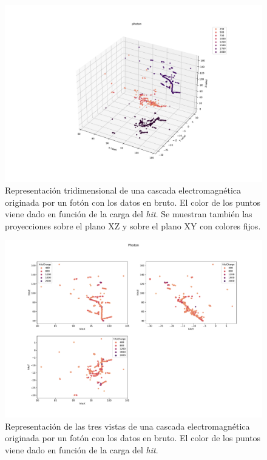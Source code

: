 \documentclass[a4paper,12pt,twoside,titlepage]{article}
\begin{document}
\begin{figure}[h!]
  \centering
  \includegraphics[scale=0.39]{3d_3.pdf}
  \caption{Representación tridimensional de una cascada electromagnética originada por un fotón con los datos en bruto. El color de los puntos viene dado en función de la carga del \textit{hit}. Se muestran también las proyecciones sobre el plano XZ y sobre el plano XY con colores fijos.}
  \label{fig:3d}
\end{figure}
\begin{figure}[h!]
  \centering
  \includegraphics[scale=0.39]{vistas_3.pdf}
  \caption{Representación de las tres vistas de una cascada electromagnética originada por un fotón con los datos en bruto. El color de los puntos viene dado en función de la carga del \textit{hit}.}
  \label{fig:vistas}
\end{figure}
\end{document}
